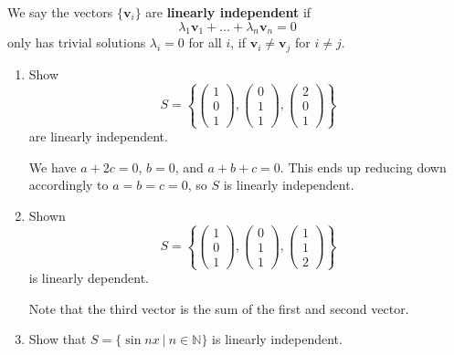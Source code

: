 \documentclass[letter-paper]{tufte-book}
\newenvironment{example}[1][Example]{\begin{trivlist}
\item[\hskip \labelsep {\bfseries #1}]}{\end{trivlist}}
\newcommand{\vb}{{\boldsymbol{v}}}
\begin{document}
We say the vectors $\{\vb_i\}$ are \textbf{linearly independent} if
\begin{equation}
  \lambda_1 \vb_1 + \ldots + \lambda_n \vb_n = 0
\end{equation}
only has trivial solutions $\lambda_i = 0$ for all $i$, if $\vb_i \neq \vb_j$ for $i\neq j$.

\begin{example}
  \begin{enumerate}
    \item Show
    \begin{equation*}
      S = \left\{\begin{pmatrix}1 \\ 0\\ 1\end{pmatrix}, \begin{pmatrix}0 \\ 1\\ 1\end{pmatrix}, \begin{pmatrix}2 \\ 0\\ 1\end{pmatrix}\right\}
    \end{equation*}
    are linearly independent.
    
    We have $a+2c = 0$, $b=0$, and $a+b+c=0$. This ends up reducing down accordingly to $a=b=c=0$, so $S$ is linearly independent.
    
    \item Shown
    \begin{equation*}
      S = \left\{\begin{pmatrix}1 \\ 0\\ 1\end{pmatrix}, \begin{pmatrix}0 \\ 1\\ 1\end{pmatrix}, \begin{pmatrix}1 \\ 1\\ 2\end{pmatrix}\right\}
    \end{equation*}
    is linearly dependent.
    
    Note that the third vector is the sum of the first and second vector.
    
    \item Show that $S=\{\sin nx\ |\ n\in\mathbb{N}\}$ is linearly independent.
    

\end{enumerate}
\end{example}
\end{document}
